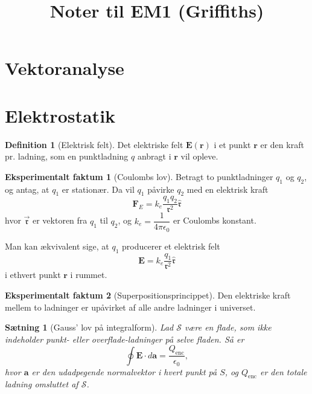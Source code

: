 \documentclass[]{article}
\title{Noter til EM1 (Griffiths)}
\newcommand{\fr}{\mathfrak{r}}
\newcommand{\vfr}{\vec{\mathfrak{r}}}
\newcommand{\hfr}{\hat{\mathfrak{r}}}
\newtheorem{theorem}{Sætning}
\theoremstyle{definition}
\newtheorem{definition}{Definition}
\newtheorem{experimental}{Eksperimentalt faktum}
\newcommand{\Qenc}{Q_\text{enc}}
\begin{document}
\maketitle

\section{Vektoranalyse}

\section{Elektrostatik}

\begin{definition}[Elektrisk felt]
	Det elektriske felt $ \mathbf{E}(\mathbf{r})$ i et punkt $\mathbf{r}$ er den kraft pr. ladning, som en punktladning $q$ anbragt i $\mathbf{r} $ vil opleve.
\end{definition}

\begin{experimental}[Coulombs lov]
	Betragt to punktladninger $q_1$ og $q_2$, og antag, at $q_1$ er stationær. Da vil $q_1$ påvirke $q_2$ med en elektrisk kraft
	\begin{equation*}
		\mathbf{F}_E = k_e \dfrac{q_1 q_2}{\fr^2} \hfr
	\end{equation*}
	hvor $\vfr$ er vektoren fra $q_1$ til $q_2$, og $k_e = \dfrac{1}{4\pi \epsilon_0}$ er Coulombs konstant.
	
	Man kan ækvivalent sige, at $q_1$ producerer et elektrisk felt
	\begin{equation*}
		\mathbf{E} = k_e \dfrac{q_1}{\fr^2} \hfr
	\end{equation*}
	i ethvert punkt $\mathbf{r}$ i rummet.
\end{experimental}

\begin{experimental}[Superpositionsprincippet]
	Den elektriske kraft mellem to ladninger er upåvirket af alle andre ladninger i universet.
\end{experimental}


\begin{theorem}[Gauss' lov på integralform]
	Lad $\mathcal{S}$ være en flade, som ikke indeholder punkt- eller overflade-ladninger på selve fladen. Så er
	\begin{equation*}
		\oint \mathbf{E} \cdot d \mathbf{a} = \frac{\Qenc}{\epsilon_0}, 
	\end{equation*}
	hvor $\mathbf{a}$ er den udadpegende normalvektor i hvert punkt på $S$, og $\Qenc$ er den totale ladning omsluttet af $\mathcal{S}$.
\end{theorem}
\end{document}
